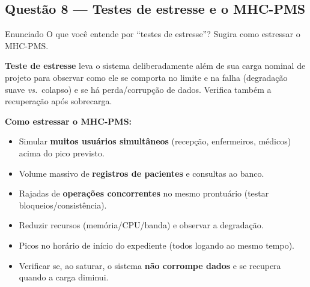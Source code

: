 \documentclass[11pt,a4paper]{article}
\begin{document}
\subsection*{Questão 8 — Testes de estresse e o MHC-PMS}
\begin{questao}{Enunciado}
O que você entende por “testes de estresse”? Sugira como estressar o MHC-PMS.
\end{questao}
\begin{resposta}
\textbf{Teste de estresse} leva o sistema deliberadamente além de sua carga
nominal de projeto para observar como ele se comporta no limite e na falha
(degradação suave \emph{vs.}\ colapso) e se há perda/corrupção de dados.
Verifica também a recuperação após sobrecarga.

\textbf{Como estressar o MHC-PMS:}
\begin{itemize}[nosep]
  \item Simular \textbf{muitos usuários simultâneos} (recepção, enfermeiros,
        médicos) acima do pico previsto.
  \item Volume massivo de \textbf{registros de pacientes} e consultas ao banco.
  \item Rajadas de \textbf{operações concorrentes} no mesmo prontuário (testar
        bloqueios/consistência).
  \item Reduzir recursos (memória/CPU/banda) e observar a degradação.
  \item Picos no horário de início do expediente (todos logando ao mesmo tempo).
  \item Verificar se, ao saturar, o sistema \textbf{não corrompe dados} e se
        recupera quando a carga diminui.
\end{itemize}
\end{resposta}

\end{document}
